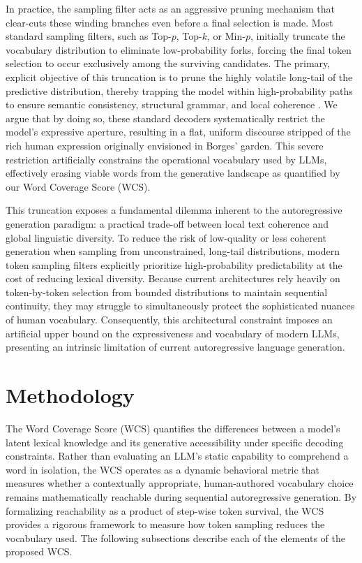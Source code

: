 \documentclass{article}
\begin{document}
In practice, the sampling filter acts as an aggressive pruning mechanism that clear-cuts these winding branches even before a final selection is made. Most standard sampling filters, such as Top-$p$, Top-$k$, or Min-$p$, initially truncate the vocabulary distribution to eliminate low-probability forks, forcing the final token selection to occur exclusively among the surviving candidates. The primary, explicit objective of this truncation is to prune the highly volatile long-tail of the predictive distribution, thereby trapping the model within high-probability paths to ensure semantic consistency, structural grammar, and local coherence \cite{holtzman2019curious}. We argue that by doing so, these standard decoders systematically restrict the model's expressive aperture, resulting in a flat, uniform discourse stripped of the rich human expression originally envisioned in Borges' garden. This severe restriction artificially constrains the operational vocabulary used by LLMs, effectively erasing viable words from the generative landscape as quantified by our Word Coverage Score (WCS).

This truncation exposes a fundamental dilemma inherent to the autoregressive generation paradigm: a practical trade-off between local text coherence and global linguistic diversity. To reduce the risk of low-quality or less coherent generation when sampling from unconstrained, long-tail distributions, modern token sampling filters explicitly prioritize high-probability predictability at the cost of reducing lexical diversity. Because current architectures rely heavily on token-by-token selection from bounded distributions to maintain sequential continuity, they may struggle to simultaneously protect the sophisticated nuances of human vocabulary. Consequently, this architectural constraint imposes an artificial upper bound on the expressiveness and vocabulary of modern LLMs, presenting an intrinsic limitation of current autoregressive language generation.



\section{Methodology}
\label{sec:Methodology}

The Word Coverage Score (WCS) quantifies the differences between a model's latent lexical knowledge and its generative accessibility under specific decoding constraints. Rather than evaluating an LLM's static capability to comprehend a word in isolation, the WCS operates as a dynamic behavioral metric that measures whether a contextually appropriate, human-authored vocabulary choice remains mathematically reachable during sequential autoregressive generation.  By formalizing reachability as a product of step-wise token survival, the WCS provides a rigorous framework to measure how token sampling reduces the vocabulary used. The following subsections describe each of the elements of the proposed WCS.
\end{document}
